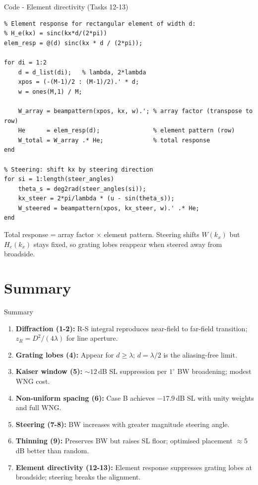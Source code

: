 \documentclass[aspectratio=169,9pt]{beamer}
\begin{document}
\begin{frame}[fragile]{Code - Element directivity (Tasks 12-13)}
\vspace{-0.3em}
\begin{lstlisting}
% Element response for rectangular element of width d:
% H_e(kx) = sinc(kx*d/(2*pi))
elem_resp = @(d) sinc(kx * d / (2*pi));

for di = 1:2
    d = d_list(di);   % lambda, 2*lambda
    xpos = (-(M-1)/2 : (M-1)/2).' * d;
    w = ones(M,1) / M;

    W_array = beampattern(xpos, kx, w).'; % array factor (transpose to row)
    He      = elem_resp(d);               % element pattern (row)
    W_total = W_array .* He;              % total response
end

% Steering: shift kx by steering direction
for si = 1:length(steer_angles)
    theta_s = deg2rad(steer_angles(si));
    kx_steer = 2*pi/lambda * (u - sin(theta_s));
    W_steered = beampattern(xpos, kx_steer, w).' .* He;
end
\end{lstlisting}

\scriptsize Total response = array factor $\times$ element pattern. Steering shifts $W(k_x)$ but $H_e(k_x)$ stays fixed, so grating lobes reappear when steered away from broadside.
\end{frame}

\section*{Summary}

\begin{frame}{Summary}
\begin{enumerate}\setlength\itemsep{3pt}
  \item \textbf{Diffraction (1-2):} R-S integral reproduces near-field to far-field transition; $z_R = D^2/(4\lambda)$ for line aperture.
  \item \textbf{Grating lobes (4):} Appear for $d \ge \lambda$; $d = \lambda/2$ is the aliasing-free limit.
  \item \textbf{Kaiser window (5):} ${\sim}12$\,dB SL suppression per $1^\circ$ BW broadening; modest WNG cost.
  \item \textbf{Non-uniform spacing (6):} Case B achieves $-17.9$\,dB SL with unity weights and full WNG.
  \item \textbf{Steering (7-8):} BW increases with greater magnitude steering angle.
  \item \textbf{Thinning (9):} Preserves BW but raises SL floor; optimised placement ${\approx}5$\,dB better than random.
  \item \textbf{Element directivity (12-13):} Element response suppresses grating lobes at broadside; steering breaks the alignment.
\end{enumerate}
\end{frame}
\end{document}
